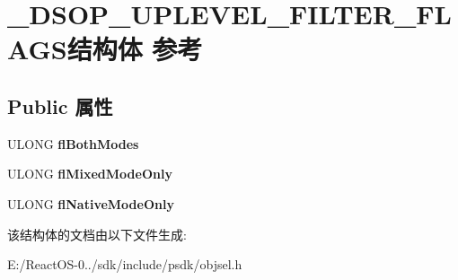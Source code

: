 \hypertarget{struct___d_s_o_p___u_p_l_e_v_e_l___f_i_l_t_e_r___f_l_a_g_s}{}\section{\+\_\+\+D\+S\+O\+P\+\_\+\+U\+P\+L\+E\+V\+E\+L\+\_\+\+F\+I\+L\+T\+E\+R\+\_\+\+F\+L\+A\+G\+S结构体 参考}
\label{struct___d_s_o_p___u_p_l_e_v_e_l___f_i_l_t_e_r___f_l_a_g_s}
\subsection*{Public 属性}
\begin{DoxyCompactItemize}
\item 
\mbox{\label{struct___d_s_o_p___u_p_l_e_v_e_l___f_i_l_t_e_r___f_l_a_g_s_aa6148d4dbb21d95001d94de407e7ba32}} 
U\+L\+O\+NG {\bfseries fl\+Both\+Modes}
\item 
\mbox{\label{struct___d_s_o_p___u_p_l_e_v_e_l___f_i_l_t_e_r___f_l_a_g_s_ac8f1f92fa81a1f4e39b767de258628d6}} 
U\+L\+O\+NG {\bfseries fl\+Mixed\+Mode\+Only}
\item 
\mbox{\label{struct___d_s_o_p___u_p_l_e_v_e_l___f_i_l_t_e_r___f_l_a_g_s_aa12305e606c48756b062441328db87e5}} 
U\+L\+O\+NG {\bfseries fl\+Native\+Mode\+Only}
\end{DoxyCompactItemize}


该结构体的文档由以下文件生成\+:\begin{DoxyCompactItemize}
\item 
E\+:/\+React\+O\+S-\/0../sdk/include/psdk/objsel.\+h\end{DoxyCompactItemize}
